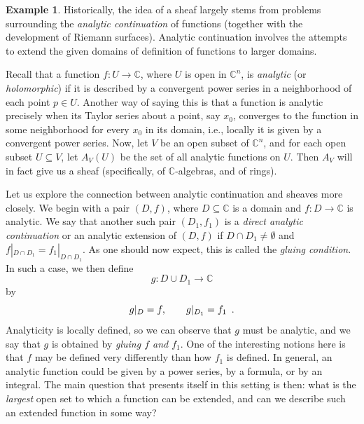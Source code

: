 \documentclass[11pt]{book}
\theoremstyle{definition}
\newtheorem{example}{Example}[section]
\theoremstyle{definition}
\theoremstyle{definition}
\theoremstyle{theorem}
\theoremstyle{definition}
\begin{document}
\begin{example}
	Historically, the idea of a sheaf largely stems from problems surrounding the \textit{analytic continuation} of functions (together with the development of Riemann surfaces). Analytic continuation involves the attempts to extend the given domains of definition of functions to larger domains. \par 
	Recall that a function $f: U \rightarrow \mathbb{C}$, where $U$ is open in $\mathbb{C}^n$, is \textit{analytic} (or \textit{holomorphic}) if it is described by a convergent power series in a neighborhood of each point $p \in U$. Another way of saying this is that a function is analytic precisely when its Taylor series about a point, say $x_0$, converges to the function in some neighborhood for every $x_0$ in its domain, i.e., locally it is given by a convergent power series. Now, let $V$ be an open subset of $\mathbb{C}^n$, and for each open subset $U \subseteq V$, let $A_V (U)$ be the set of all analytic functions on $U$. Then $A_V$ will in fact give us a sheaf (specifically, of $\mathbb{C}$-algebras, and of rings).\par 
	Let us explore the connection between analytic continuation and sheaves more closely. We begin with a pair $(D, f)$, where $D \subseteq \mathbb{C}$ is a domain and $f: D \rightarrow \mathbb{C}$ is analytic. We say that another such pair $(D_1, f_1)$ is a \textit{direct analytic continuation} or an analytic extension of $(D, f)$ if $D \cap D_1 \neq \emptyset$ and $f|_{D \cap D_1} = f_1|_{D \cap D_1}$. As one should now expect, this is called the \textit{gluing condition}. In such a case, we then define 
	\begin{equation*}
	g: D \cup D_1 \rightarrow \mathbb{C} 
	\end{equation*}
	by 
	\begin{equation*}
	g|_D = f, \hspace{2em} g|_{D_1} = f_1 \hspace*{0.5em} .
	\end{equation*} 
	Analyticity is locally defined, so we can observe that $g$ must be analytic, and we say that $g$ is obtained by \textit{gluing $f$ and $f_1$}. One of the interesting notions here is that $f$ may be defined very differently than how $f_1$ is defined. In general, an analytic function could be given by a power series, by a formula, or by an integral. The main question that presents itself in this setting is then: what is the \textit{largest} open set to which a function can be extended, and can we describe such an extended function in some way?\par 

\end{example}
\end{document}
